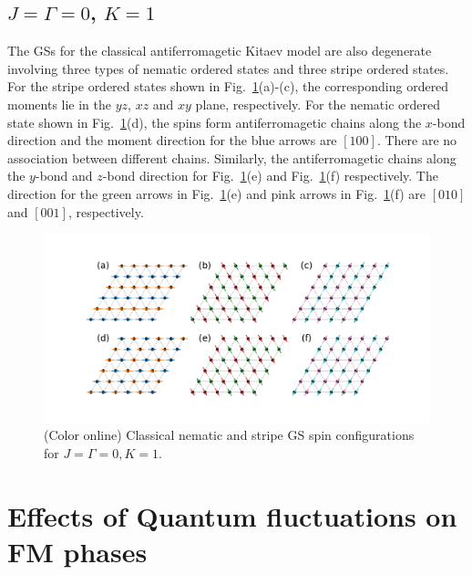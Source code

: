 \documentclass[aps,prb,reprint,amsfonts,amsmath,amssymb,showpacs,groupedaddress,superscriptaddress]{revtex4-1}
\begin{document}
\subsection{$J=\Gamma=0$, $K=1$}

The GSs for the classical antiferromagetic Kitaev model are also degenerate involving three types of nematic ordered states and three stripe ordered states. For the stripe ordered states shown in Fig.~\ref{fig:GSForPositiveK}(a)-(c), the corresponding ordered moments lie in the $yz$, $xz$ and $xy$ plane, respectively. For the nematic ordered state shown in Fig.~\ref{fig:GSForPositiveK}(d), the spins form antiferromagetic chains along the $x$-bond direction and the moment direction for the blue arrows are $[100]$. There are no association between different chains. Similarly, the antiferromagetic chains along the $y$-bond and $z$-bond direction for Fig.~\ref{fig:GSForPositiveK}(e) and Fig.~\ref{fig:GSForPositiveK}(f) respectively. The direction for the green arrows in Fig.~\ref{fig:GSForPositiveK}(e) and pink arrows in Fig.~\ref{fig:GSForPositiveK}(f) are $[010]$ and $[001]$, respectively.
\begin{figure}
    \includegraphics[width=\columnwidth]{fig/SpinConfigForPositiveKitaev.pdf}
    \caption{\label{fig:GSForPositiveK}(Color online) Classical nematic and stripe GS spin configurations for $J=\Gamma=0, K=1$.}
\end{figure}

\section{\label{apx:LSWOfFMA}Effects of Quantum fluctuations on FM phases}
\end{document}
